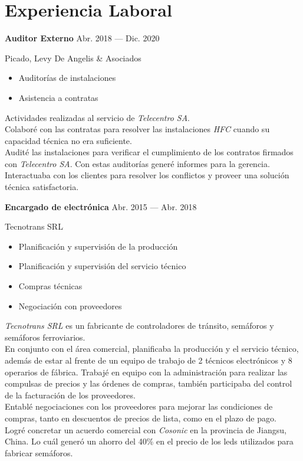 \section{Experiencia Laboral}

\parbox[t][][t]{\linewidth}{
	\parbox{\linewidth}{
		\textbf{Auditor Externo}
			\hfill
			{Abr. 2018 --- Dic. 2020}
		}
	\smallbreak
	\parbox{\linewidth}{Picado, Levy De Angelis \& Asociados}
	\smallbreak
	\begin{itemize}
	    \item{Auditorías de instalaciones}
	    \item{Asistencia a contratas}
	\end{itemize}
	\smallbreak
	Actividades realizadas al servicio de \emph{Telecentro SA}.\\
	Colaboré con las contratas para resolver las instalaciones \emph{HFC} cuando su capacidad técnica no era suficiente.\\
	Audité las instalaciones para verificar el cumplimiento de los contratos firmados con \emph{Telecentro SA}. Con estas auditorías generé informes para la gerencia.\\
	Interactuaba con los clientes para resolver los conflictos y proveer una solución técnica satisfactoria.
	
}

\bigskip
\parbox[t][][t]{\linewidth}{
	{\parbox{\linewidth}{
		\parbox{\linewidth}{
			\textbf{Encargado de electrónica}
			\hfill
			{Abr. 2015 --- Abr. 2018}
		}
	}}
	\smallbreak
	\parbox{\linewidth}{Tecnotrans SRL}
	\smallbreak
	\begin{itemize}
	    \item{Planificación y supervisión de la producción}
	    \item{Planificación y supervisión del servicio técnico}
	    \item{Compras técnicas}
	    \item{Negociación con proveedores}
	\end{itemize}
	\smallbreak
	\emph{Tecnotrans SRL} es un fabricante de controladores de tránsito, semáforos y semáforos ferroviarios.\\
	En conjunto con el área comercial, planificaba la producción y el servicio técnico, además de estar al frente de un equipo de trabajo de 2 técnicos electrónicos y 8 operarios de fábrica.
	Trabajé en equipo con la administración para realizar las compulsas de precios y las órdenes de compras, también participaba del control de la facturación de los proveedores.\\
	Entablé negociaciones con los proveedores para mejorar las condiciones de compras, tanto en descuentos de precios de lista, como en el plazo de pago.\\
	Logré concretar un acuerdo comercial con \emph{Cosonic} en la provincia de Jiangsu, China. Lo cuál generó un ahorro del 40\% en el precio de los leds utilizados para fabricar semáforos.

}

